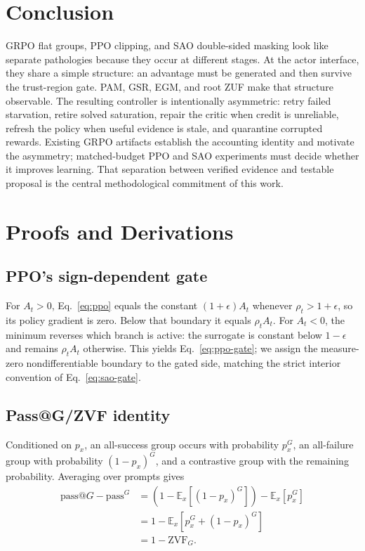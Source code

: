 \documentclass{article}
\newcommand{\E}{\mathbb{E}}
\begin{document}
\section{Conclusion}

GRPO flat groups, PPO clipping, and SAO double-sided masking look like separate
pathologies because they occur at different stages.  At the actor interface,
they share a simple structure: an advantage must be generated and then survive
the trust-region gate.  PAM, GSR, EGM, and root ZUF make that structure
observable.  The resulting controller is intentionally asymmetric: retry
failed starvation, retire solved saturation, repair the critic when credit is
unreliable, refresh the policy when useful evidence is stale, and quarantine
corrupted rewards.  Existing GRPO artifacts establish the accounting identity
and motivate the asymmetry; matched-budget PPO and SAO experiments must decide
whether it improves learning.  That separation between verified evidence and
testable proposal is the central methodological commitment of this work.



\appendix

\section{Proofs and Derivations}
\label{app:proofs}

\subsection{PPO's sign-dependent gate}

For $A_t>0$, Eq.~\eqref{eq:ppo} equals the constant
$(1+\epsilon)A_t$ whenever $\rho_t>1+\epsilon$, so its policy gradient is zero.
Below that boundary it equals $\rho_tA_t$.  For $A_t<0$, the minimum reverses
which branch is active: the surrogate is constant below $1-\epsilon$ and remains
$\rho_tA_t$ otherwise.  This yields Eq.~\eqref{eq:ppo-gate}; we assign the measure-zero
nondifferentiable boundary to the gated side, matching the strict interior
convention of Eq.~\eqref{eq:sao-gate}.

\subsection{Pass@G/ZVF identity}

Conditioned on $p_x$, an all-success group occurs with probability $p_x^G$,
an all-failure group with probability $(1-p_x)^G$, and a contrastive group
with the remaining probability.  Averaging over prompts gives
\begin{align*}
  \mathrm{pass@}G-\mathrm{pass}^{G}
  &=\left(1-\E_x[(1-p_x)^G]\right)-\E_x[p_x^G]\\
  &=1-\E_x[p_x^G+(1-p_x)^G]\\
  &=1-\mathrm{ZVF}_G.
\end{align*}
\end{document}
